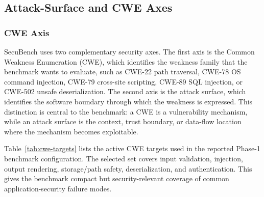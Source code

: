 \documentclass[11pt]{article}
\newcommand{\toolname}{SecuBench}
\begin{document}
\begin{table}[t]
\centering
\caption{Agent roles used by the \toolname{} pipeline.}
\label{tab:agent-stack}
\end{table}

\subsection{Attack-Surface and CWE Axes}

\subsubsection{CWE Axis}

\toolname{} uses two complementary security axes. The first axis is the Common Weakness Enumeration (CWE), which identifies the weakness family that the benchmark wants to evaluate, such as CWE-22 path traversal, CWE-78 OS command injection, CWE-79 cross-site scripting, CWE-89 SQL injection, or CWE-502 unsafe deserialization. The second axis is the attack surface, which identifies the software boundary through which the weakness is expressed. This distinction is central to the benchmark: a CWE is a vulnerability mechanism, while an attack surface is the context, trust boundary, or data-flow location where the mechanism becomes exploitable.

Table~\ref{tab:cwe-targets} lists the active CWE targets used in the reported Phase-1 benchmark configuration. The selected set covers input validation, injection, output rendering, storage/path safety, deserialization, and authentication. This gives the benchmark compact but security-relevant coverage of common application-security failure modes.
\end{document}
